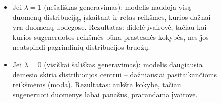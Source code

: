 \documentclass{VUMIFInfKursinis}
\begin{document}
\begin{figure}[H]
    \begin{itemize}
        \item Jei \textbf{\textcolor{raudona}{\(\lambda = 1 \)}} (nešališkas generavimas): modelis naudoja visą duomenų distribuciją, įskaitant ir retas reikšmes, kurios dažnai yra duomenų uodegose. Rezultatas: didelė įvairovė, tačiau kai kurios sugeneruotos reikšmės būna prastesnės kokybės, nes jos neatspindi pagrindinių distribucijos bruožų.
        \item Jei \textbf{\textcolor{raudona}{\(\lambda = 0 \)}} (visiškai šališkas generavimas): modelis daugiausia dėmesio skiria distribucijos centrui – dažniausiai pasitaikančioms reikšmėms (moda). Rezultatas: aukšta kokybė, tačiau sugeneruoti duomenys labai panašūs, prarandama įvairovė.
    \end{itemize}
\end{figure}
\end{document}
